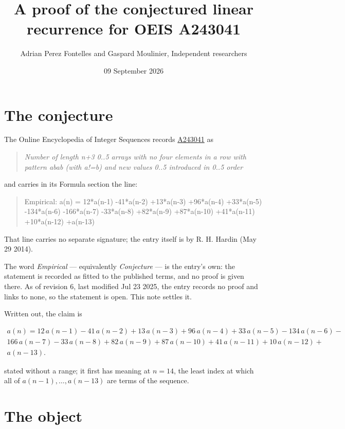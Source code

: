 \documentclass[11pt]{article}
\title{A proof of the conjectured linear recurrence for OEIS A243041}
\author{Adrian Perez Fontelles and Gaspard Moulinier, Independent researchers}
\date{09 September 2026}
\theoremstyle{definition}
\begin{document}
\maketitle
\section{The conjecture}

The Online Encyclopedia of Integer Sequences records \href{https://oeis.org/A243041}{A243041} as

\begin{quote}\itshape Number of length n+3 0..5 arrays with no four elements in a row with pattern abab (with a!=b) and new values 0..5 introduced in 0..5 order\end{quote}

and carries in its Formula section the line:

\begin{quote}\ttfamily Empirical: a(n) = 12*a(n-1) -41*a(n-2) +13*a(n-3) +96*a(n-4) +33*a(n-5) -134*a(n-6) -166*a(n-7) -33*a(n-8) +82*a(n-9) +87*a(n-10) +41*a(n-11) +10*a(n-12) +a(n-13)\end{quote}

That line carries no separate signature; the entry itself is by R. H. Hardin (May 29 2014).

The word {\itshape Empirical} --- equivalently {\itshape Conjecture} --- is the entry's own: the statement is recorded as fitted to the published terms, and no proof is given there. As of revision 6, last modified Jul 23 2025, the entry records no proof and links to none, so the statement is open. This note settles it.

Written out, the claim is

\begin{multline*} a(n) = 12\,a(n-1) - 41\,a(n-2) + 13\,a(n-3) + 96\,a(n-4) + 33\,a(n-5) - 134\,a(n-6) - \\ 166\,a(n-7) - 33\,a(n-8) + 82\,a(n-9) + 87\,a(n-10) + 41\,a(n-11) + 10\,a(n-12) + \\ a(n-13). \end{multline*}

stated without a range; it first has meaning at $n = 14$, the least index at which all of $a(n-1),\dots,a(n-13)$ are terms of the sequence.

\section{The object}
\end{document}
